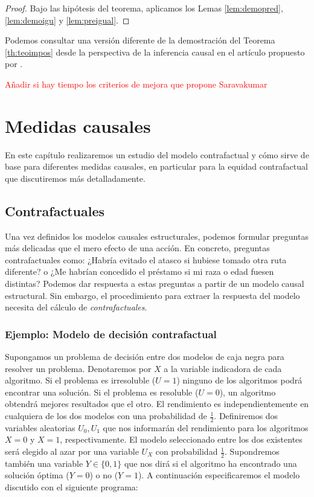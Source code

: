 \documentclass[oneside,openright,titlepage,numbers=noenddot,openany,headinclude,footinclude=true,
cleardoublepage=empty,abstractoff,BCOR=5mm,paper=a4,fontsize=12pt,main=spanish]{scrreprt}
\begin{document}
\begin{proof}
Bajo las hipótesis del teorema, aplicamos los Lemas \ref{lem:demopred}, \ref{lem:demoigu} y \ref{lem:preigual}.
\end{proof}

Podemos consultar una versión diferente de la demostración del Teorema \ref{th:teoimpos} desde la perspectiva de la inferencia causal en el artículo propuesto por \cite{impossibilityth2021}.

\textcolor{red}{Añadir si hay tiempo los criterios de mejora que propone Saravakumar}


\chapter{Medidas causales}

En este capítulo realizaremos un estudio del modelo contrafactual y cómo sirve de base para diferentes medidas causales, en particular para la equidad contrafactual que discutiremos más detalladamente. 

\section{Contrafactuales}

Una vez definidos los modelos causales estructurales, podemos formular preguntas más delicadas que el mero efecto de una acción. En concreto, preguntas contrafactuales como: ¿Habría evitado el atasco si hubiese tomado otra ruta diferente? o ¿Me habrían concedido el préstamo si mi raza o edad fuesen distintas? Podemos dar respuesta a estas preguntas a partir de un modelo causal estructural. Sin embargo, el procedimiento para extraer la respuesta del modelo necesita del cálculo de \textit{contrafactuales}.

\subsection{Ejemplo: Modelo de decisión contrafactual}

Supongamos un problema de decisión entre dos modelos de caja negra para resolver un problema. Denotaremos por $X$ a la variable indicadora de cada algoritmo. Si el problema es irresoluble ($U=1$) ninguno de los algoritmos podrá encontrar una solución. Si el problema es resoluble ($U=0$), un algoritmo obtendrá mejores resultados que el otro. El rendimiento es independientemente en cualquiera de los dos modelos con una probabilidad de $\frac{1}{2}$. Definiremos dos variables aleatorias $U_0, U_1$ que nos informarán del rendimiento para los algoritmos $X=0$ y $X=1$, respectivamente. El modelo seleccionado entre los dos existentes será elegido al azar por una variable $U_X$ con probabilidad $\frac{1}{2}$. Supondremos también una variable $Y \in \{0,1\}$ que nos dirá si el algoritmo ha encontrado una solución óptima ($Y=0$) o no ($Y=1$). A continuación especificaremos el modelo discutido con el siguiente programa:
\end{document}
